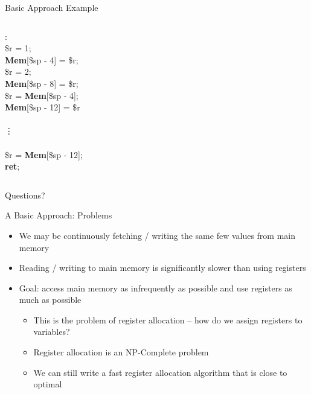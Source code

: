 \documentclass[aspectratio=169]{beamer}
\begin{document}
\begin{frame}{Basic Approach Example}
\begin{columns}
\begin{column}{3cm}
\begin{algo}
                :\+
                \\ \$r = 1;
                \\ \textbf{Mem}[\$sp - 4] = \$r;
                \\ \$r = 2;
                \\ \textbf{Mem}[\$sp - 8] = \$r;
                \\ \$r = \textbf{Mem}[\$sp - 4];
                \\ \textbf{Mem}[\$sp - 12] = \$r
                \\
                \\ \vdots
                \\
                \\ \$r = \textbf{Mem}[\$sp - 12];
                \\ \textbf{ret};
            \end{algo}
        \end{column}
    \end{columns}
\end{frame}

\begin{frame}{}
      \begin{center}
    {\color{sigma@mainblue} \LARGE Questions?}
  \end{center}
\end{frame}

\begin{frame}{A Basic Approach: Problems}
    \begin{itemize}
        \item We may be continuously fetching / writing the same few values from main memory
        \pause
        \item Reading / writing to main memory is significantly slower than using registers
        \item Goal: access main memory as infrequently as possible and use registers as much as possible
        \pause
        \begin{itemize}
            \item This is the problem of register allocation -- how do we assign registers to variables?
            \item Register allocation is an NP-Complete problem
            \pause
            \item We can still write a fast register allocation algorithm that is close to optimal
        \end{itemize}
    \end{itemize}
\end{frame}
\end{document}
